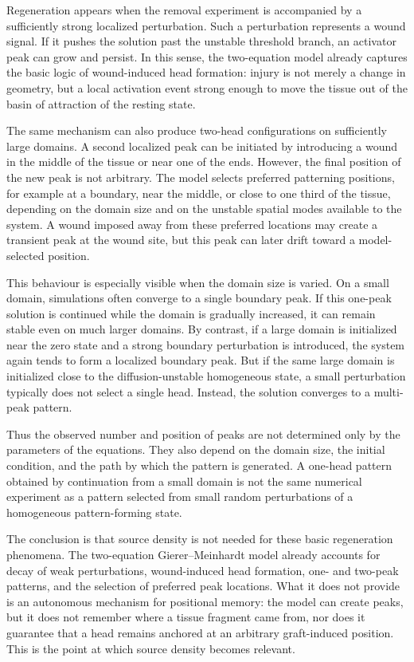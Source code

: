 Regeneration appears when the removal experiment is accompanied by a sufficiently
strong localized perturbation. Such a perturbation represents a wound signal. If
it pushes the solution past the unstable threshold branch, an activator peak can
grow and persist. In this sense, the two-equation model already captures the
basic logic of wound-induced head formation: injury is not merely a change in
geometry, but a local activation event strong enough to move the tissue out of
the basin of attraction of the resting state.

The same mechanism can also produce two-head configurations on sufficiently
large domains. A second localized peak can be initiated by introducing a wound in
the middle of the tissue or near one of the ends. However, the final position of
the new peak is not arbitrary. The model selects preferred patterning positions,
for example at a boundary, near the middle, or close to one third of the tissue,
depending on the domain size and on the unstable spatial modes available to the
system. A wound imposed away from these preferred locations may create a
transient peak at the wound site, but this peak can later drift toward a
model-selected position.

This behaviour is especially visible when the domain size is varied. On a small
domain, simulations often converge to a single boundary peak. If this one-peak
solution is continued while the domain is gradually increased, it can remain
stable even on much larger domains. By contrast, if a large domain is initialized
near the zero state and a strong boundary perturbation is introduced, the system
again tends to form a localized boundary peak. But if the same large domain is
initialized close to the diffusion-unstable homogeneous state, a small
perturbation typically does not select a single head. Instead, the solution
converges to a multi-peak pattern.

Thus the observed number and position of peaks are not determined only by the
parameters of the equations. They also depend on the domain size, the initial
condition, and the path by which the pattern is generated. A one-head pattern
obtained by continuation from a small domain is not the same numerical experiment
as a pattern selected from small random perturbations of a homogeneous
pattern-forming state.

The conclusion is that source density is not needed for these basic regeneration
phenomena. The two-equation Gierer--Meinhardt model already accounts for decay
of weak perturbations, wound-induced head formation, one- and two-peak patterns,
and the selection of preferred peak locations. What it does not provide is an
autonomous mechanism for positional memory: the model can create peaks, but it
does not remember where a tissue fragment came from, nor does it guarantee that a
head remains anchored at an arbitrary graft-induced position. This is the point
at which source density becomes relevant.
